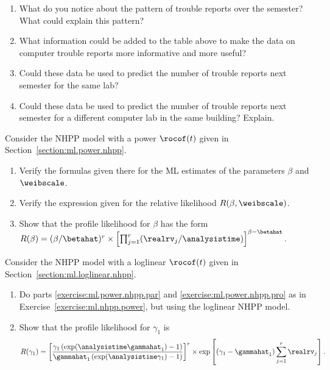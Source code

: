 \begin{exercise}
\begin{enumerate}
\item
What do you notice about the pattern of trouble reports over the semester?
What could explain this pattern?
\item
What information could be added to the table above to make the
data on computer trouble reports more informative and more useful?
\item
Could these data be used to predict the number of trouble reports next
semester for the same lab? 
\item
Could these data be used to predict the number of trouble reports next
semester for a different computer lab in the same building? Explain.
\end{enumerate}
\end{exercise}

\begin{exercise1}
\label{exercise:ml.nhpp.power}
Consider the 
NHPP model with a power $\rocof(t)$ given in 
Section~\ref{section:ml.power.nhpp}.
\begin{enumerate}
\item
\label{exercise:ml.power.nhpp.par}
Verify the formulas given there for the
ML estimates of the parameters $\beta$ and $\weibscale$.
\item
\label{exercise:ml.power.nhpp.pro}
Verify the expression given for the relative likelihood $R(\beta,\weibscale)$.
\item
Show that the profile likelihood for $\beta$
has the form $R(\beta)=(\beta/\betahat)^{r} 
\times \left [ \prod_{j=1}^{r} (\realrv_{j}/\analysistime)
\right ]^{\beta-\betahat}.$
\end{enumerate}
\end{exercise1}
\begin{exercise1}
Consider the 
NHPP model with a loglinear $\rocof(t)$ given in 
Section~\ref{section:ml.loglinear.nhpp}.
\begin{enumerate}
\item
Do parts \ref{exercise:ml.power.nhpp.par}
and \ref{exercise:ml.power.nhpp.pro}
as in Exercise~\ref{exercise:ml.nhpp.power},
but using the  loglinear NHPP model.
\item
Show that the profile likelihood for $\gamma_{1}$
is 
\begin{displaymath}
R(\gamma_{1})=
\left [
  \frac{  
\gamma_{1} \, (   \exp(\analysistime \gammahat_{1}) -1)
       }
       {
\gammahat_{1} \,  (   \exp(\analysistime \gamma_{1}) -1)
       }
\right ]^{r}
\times
\exp \left [ 
(\gamma_{1}-\gammahat_{1}) \sum_{j=1}^{r} \realrv_{j}
    \right ].
\end{displaymath}
\end{enumerate}
\end{exercise1}

